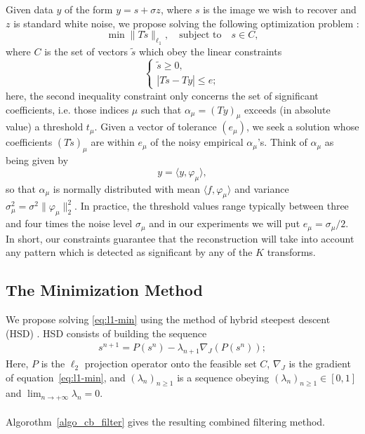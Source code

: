 Given data $y$ of the form $y = s + \sigma z$, where $s$ is the image
we wish to recover and $z$ is standard white noise, we propose solving
the following optimization problem \citep{starck:spie01a}:
\begin{equation}
  \label{eq:l1-min}
  \min \|T\tilde{s}\|_{\ell_1}, \quad \mbox{subject to} \quad s \in C,  
\end{equation}
where $C$ is the set of vectors $\tilde{s}$ 
which obey the linear constraints
\begin{equation}
\label{eq:constraints}
\left\{  \begin{array}{ll}
  \tilde{s} \ge 0, \\
  |T\tilde{s} - Ty| \le e; 
  \end{array}
  \right. 
\end{equation}
here, the second inequality constraint 
only concerns the set of significant coefficients, 
i.e. those indices $\mu$ such that $\alpha_\mu =
(Ty)_\mu$ exceeds (in absolute value) a threshold $t_\mu$. Given a
vector of tolerance $(e_\mu)$, we seek a solution whose coefficients
  $(T\tilde{s})_\mu$ are within $e_\mu$ of the noisy
empirical $\alpha_\mu$'s.  Think of $\alpha_\mu$ as being given by
\[
y = \langle y, \varphi_\mu \rangle, 
\]
so that $\alpha_\mu$ is normally distributed with mean $\langle f,
\varphi_\mu \rangle$ and variance $\sigma^2_\mu = \sigma^2
\|\varphi_\mu\|^2_2$. In practice, the threshold values range
typically between three and four times the noise level $\sigma_\mu$
and in our experiments we will put $e_\mu = \sigma_\mu/2$. In short,
our constraints guarantee that the reconstruction will take into
account any pattern which is detected as significant by  any of the
$K$ transforms.
   
\subsection{The Minimization Method}

We propose solving \eqref{eq:l1-min} using the method of hybrid steepest descent (HSD) \citep{wave:yamada01}. 
HSD consists of building the sequence
\begin{eqnarray}
 s^{n+1} = P(s^{n}) - \lambda_{n+1} \nabla_J(P(s^{n})); 
\end{eqnarray}
Here, $P$ is the $\ell_2$ projection operator onto the feasible set $C$, $\nabla_J$ is the gradient of equation~\eqref{eq:l1-min}, 
and $(\lambda_{n})_{n \ge 1}$ is a sequence obeying $(\lambda_{n})_{n\ge 1} \in [0,1] $ and $\lim_{ n \rightarrow + \infty } \lambda_{n} = 0$.\\ \\
Algorothm~\ref{algo_cb_filter} gives the resulting combined filtering method.

